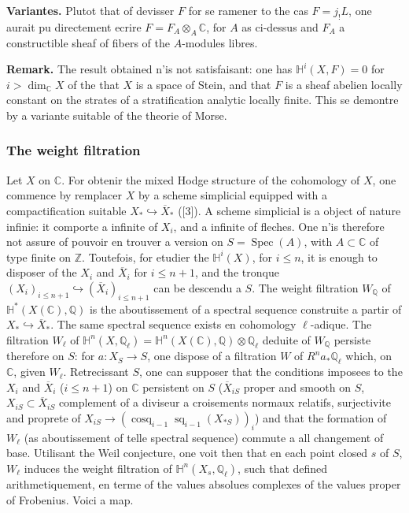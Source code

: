 \documentclass[12pt,a4paper]{article}
\theoremstyle{plain}
\theoremstyle{definition}
\theoremstyle{remark}
\DeclareMathOperator{\Spec}{Spec}
\DeclareMathOperator{\cosq}{cosq}
\DeclareMathOperator{\sq}{sq}
\newcommand{\CC}{\mathbb{C}}
\newcommand{\HH}{\mathbb{H}}
\newcommand{\QQ}{\mathbb{Q}}
\newcommand{\ZZ}{\mathbb{Z}}
\begin{document}
\medskip
\noindent\textbf{Variantes.} Plutot that of devisser $F$ for se ramener to the cas $F = j_!L$, one aurait pu directement ecrire $F = F_A \otimes_A \CC$, for $A$ as ci-dessus and $F_A$ a constructible sheaf of fibers of the $A$-modules libres.

\medskip
\noindent\textbf{Remark.} The result obtained n'is not satisfaisant: one has $\HH^i(X, F) = 0$ for $i > \dim_{\CC} X$ of the that $X$ is a space of Stein, and that $F$ is a sheaf abelien locally constant on the strates of a stratification analytic locally finite. This se demontre by a variante suitable of the theorie of Morse.

\subsubsection{The weight filtration}

Let $X$ on $\CC$. For obtenir the mixed Hodge structure of the cohomology of $X$, one commence by remplacer $X$ by a scheme simplicial equipped with a compactification suitable $X_* \hookrightarrow \overline{X}_*$ ([3]). A scheme simplicial is a object of nature infinie: it comporte a infinite of $X_i$, and a infinite of fleches. One n'is therefore not assure of pouvoir en trouver a version on $S = \Spec(A)$, with $A \subset \CC$ of type finite on $\ZZ$. Toutefois, for etudier the $\HH^i(X)$, for $i \leq n$, it is enough to disposer of the $X_i$ and $\overline{X}_i$ for $i \leq n+1$, and the tronque $(X_i)_{i \leq n+1} \hookrightarrow (\overline{X}_i)_{i \leq n+1}$ can be descendu a $S$. The weight filtration $W_{\QQ}$ of $\HH^*(X(\CC), \QQ)$ is the aboutissement of a spectral sequence construite a partir of $X_* \hookrightarrow \overline{X}_*$. The same spectral sequence exists en cohomology $\ell$-adique. The filtration $W_{\ell}$ of $\HH^n(X, \QQ_{\ell}) = \HH^n(X(\CC), \QQ) \otimes \QQ_{\ell}$ deduite of $W_{\QQ}$ persiste therefore on $S$: for $a: X_S \to S$, one dispose of a filtration $W$ of $R^na_*\QQ_{\ell}$ which, on $\CC$, given $W_{\ell}$. Retrecissant $S$, one can supposer that the conditions imposees to the $X_i$ and $\overline{X}_i$ ($i \leq n+1$) on $\CC$ persistent on $S$ ($\overline{X}_{iS}$ proper and smooth on $S$, $X_{iS} \subset \overline{X}_{iS}$ complement of a diviseur a croisements normaux relatifs, surjectivite and proprete of $X_{iS} \to (\cosq_{i-1}\sq_{i-1}(X_{*S}))_i$) and that the formation of $W_{\ell}$ (as aboutissement of telle spectral sequence) commute a all changement of base. Utilisant the Weil conjecture, one voit then that en each point closed $s$ of $S$, $W_{\ell}$ induces the weight filtration of $\HH^n(X_s, \QQ_{\ell})$, such that defined arithmetiquement, en terme of the values absolues complexes of the values proper of Frobenius. Voici a map.
\end{document}
